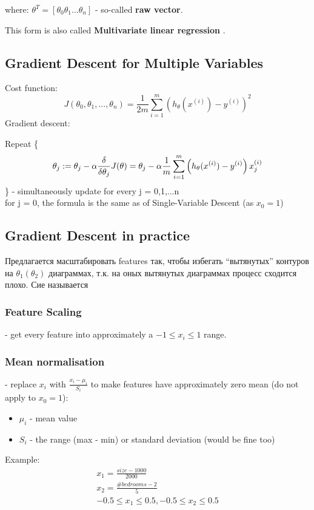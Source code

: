 \documentclass{scrartcl}
\begin{document}
where: $\theta^T = [\theta_0 \theta_1 ... \theta_n]$ - so-called {\bf
  raw vector}. 

This form is also called {\bf Multivariate linear regression }.

\subsection {Gradient Descent for Multiple Variables}
Cost function:
\[
J(\theta_0, \theta_1, ..., \theta_n) = \frac{1}{2m}
\sum\limits_{i=1}^m\left(h_\theta(x^{(i)}) - y^{(i)} \right)^2
\]
Gradient descent: 

Repeat \{
\[ \theta_j := \theta_j - \alpha \frac
{\delta}{\delta\theta_j}J(\theta) \\
= \theta_j - \alpha \frac{1}{m}
\sum\limits_{i=1}^m\left(h_\theta(x^{(i)}) - y^{(i)}
\right)x_j^{(i)} \]
\} - simultaneously update for every j = 0,1,...n \\
for j = 0, the formula is the same as of Single-Variable Descent (as
$x_0 = 1$)
\label {4-3}
\subsection {Gradient Descent in practice}
Предлагается масштабировать features так, чтобы избегать ``вытянутых''
контуров на $\theta_1(\theta_2)$ диаграммах, т.к. на оных вытянутых
диаграммах процесс сходится плохо. Сие называется

\subsubsection{ Feature Scaling} 
- get every feature into approximately a $-1 \leq x_i \leq 1$ range.
\subsubsection {Mean normalisation}
- replace $x_i$ with $\frac{x_i - \mu_i}{S_i}$ to make features have
approximately zero mean (do not apply to $x_0 = 1$):
\begin{itemize}
\item{$\mu_i$} - mean value
\item{$S_i$} - the range (max - min) or standard deviation (would be
  fine too)
\end{itemize}
Example:
\begin{equation*}
  \begin{split}
    x_1 = \frac{size-1000}{2000} \\
    x_2 = \frac{\#bedrooms-2}{5} \\
    -0.5 \leq x_1 \leq 0.5, -0.5 \leq x_2 \leq 0.5
  \end{split}
\end{equation*}
\end{document}
